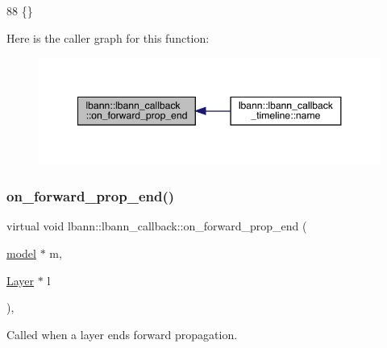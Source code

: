\begin{DoxyCode}
88 \{\}
\end{DoxyCode}
Here is the caller graph for this function\+:\nopagebreak
\begin{figure}[H]
\begin{center}
\leavevmode
\includegraphics[width=348pt]{classlbann_1_1lbann__callback_a79a0bb407852d7b330b74373647ffe46_icgraph}
\end{center}
\end{figure}
\mbox{\label{classlbann_1_1lbann__callback_a5eff0a59fbce98a981d9cdd0547a3ad5}} 
\subsubsection{\texorpdfstring{on\+\_\+forward\+\_\+prop\+\_\+end()}{on\_forward\_prop\_end()}\hspace{0.1cm}{\footnotesize\ttfamily [2/2]}}
{\footnotesize\ttfamily virtual void lbann\+::lbann\+\_\+callback\+::on\+\_\+forward\+\_\+prop\+\_\+end (\begin{DoxyParamCaption}\item[{\hyperlink{classlbann_1_1model}{model} $\ast$}]{m,  }\item[{\hyperlink{classlbann_1_1Layer}{Layer} $\ast$}]{l }\end{DoxyParamCaption})\hspace{0.3cm}{\ttfamily [inline]}, {\ttfamily [virtual]}}

Called when a layer ends forward propagation. 

